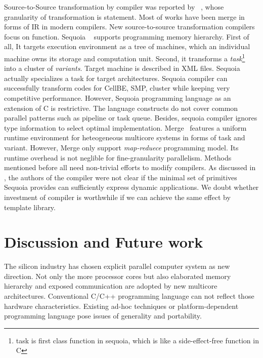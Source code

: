 \documentclass[10pt, conference, compsocconf]{IEEEtran}
\begin{document}
Source-to-Source transformation by compiler was reported by
~\cite{Loveman77}, whose granularity of transformation  is
statement.  Most of works have been merge in forms of IR in
modern compilers. New source-to-source transformation compilers focus
on function. Sequoia ~\cite{sequoia}  supports
programming memory hierarchy. First of all, It targets execution
environment as a tree of machines, which an individual machine owns
its storage and computation unit. Second, it transforms a
\textit{task}\footnote{task is first class function in sequoia, which
  is like a side-effect-free function in C} into a
cluster of \emph{variants}. Target machine
is described in XML files. Sequoia actually
specializes a task for target architectures. Sequoia compiler can
successfully transform codes for CellBE, SMP, cluster while keeping
very competitive performance. However, Sequoia programming language as
an extension of C is restrictive. The language constructs do not cover common
parallel patterns such as pipeline or task queue. Besides, sequoia compiler
ignores type information to select optimal
implementation. Merge~\cite{merge} features a uniform runtime
environment for heteogeneous multicore 
systems in forms of task and variant. However, Merge only
support \emph{map-reduece} programming model. Its runtime overhead is not neglible for fine-granularity
parallelism. Methods mentioned before all need non-trivial efforts to
modify compilers. As discussed in \cite{sequoia}, the authors of the compiler were
 not clear if the minimal set of primitives Sequoia provides can
sufficiently express dynamic applications. We doubt whether investment of
compiler is worthwhile if we can achieve the same effect by template
library.

\section{Discussion and Future work}
The silicon industry has chosen explicit parallel computer system as new
direction. Not only the more processor cores but also
elaborated memory hierarchy and exposed communication are adopted by
new multicore architectures. Conventional C/C++ programming language
can not reflect those hardware characteristics. Existing ad-hoc techniques or
platform-dependent programming language pose issues of generality and portability.
\end{document}
